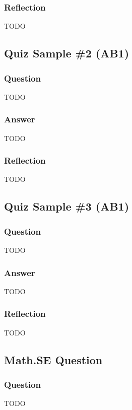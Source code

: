 \documentclass{article}
\begin{document}
\subsubsection*{Reflection}
TODO


\subsection{Quiz Sample \#2 (AB1)}
\subsubsection*{Question}
TODO

\subsubsection*{Answer}
TODO

\subsubsection*{Reflection}
TODO


\subsection{Quiz Sample \#3 (AB1)}
\subsubsection*{Question}
TODO

\subsubsection*{Answer}
TODO

\subsubsection*{Reflection}
TODO





\subsection{Math.SE Question}
\subsubsection*{Question}
TODO \cite{1089984}
\end{document}
